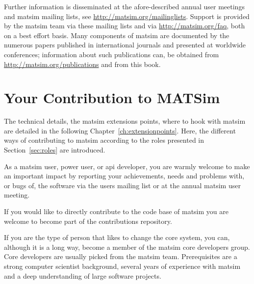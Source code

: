 Further information is disseminated at the afore-described annual user meetings and \gls{matsim} mailing lists, see \url{http://matsim.org/mailinglists}.  Support is provided by the \gls{matsim} team via these mailing lists and via \url{http://matsim.org/faq}, both on a best effort basis. 
Many components of \gls{matsim} are documented by the numerous papers published in international journals and presented at worldwide conferences; information about such publications can, \eg be obtained from \url{http://matsim.org/publications}
and from this book.


\section{Your Contribution to MATSim}
\label{sec:yourcontribution}
The technical details, \ie the \gls{matsim} extensions points, where to hook with \gls{matsim} are detailed in the following Chapter~\ref{ch:extensionpoints}.  Here, the different ways of contributing to \gls{matsim} according to the roles presented in Section~\ref{sec:roles} are introduced.

As a \gls{matsim} user, power user, or \gls{api} developer, you are warmly welcome to make an important impact by reporting your achievements, needs and problems with, or bugs of, the software via the users mailing list or at the annual \gls{matsim} user meeting. 

If you would like to directly contribute to the code base of \gls{matsim} you are welcome to become part of the \glspl{contribution} repository.

If you are the type of person that likes to change the core system, you can, although it is a long way, become a member of the \gls{matsim} core developers group. Core developers are usually picked from the \gls{matsim} team. Prerequisites are a strong computer scientist background, several years of experience with \gls{matsim} and a deep understanding of large software projects.

